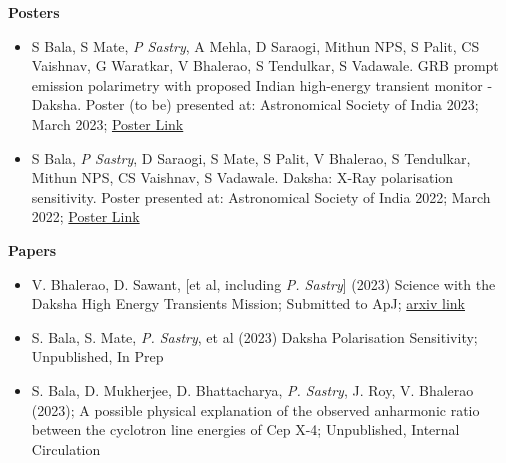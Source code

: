 {
    \textbf{Posters}
    \begin{itemize}
        \item S Bala, S Mate, \emph{P Sastry}, A Mehla, D Saraogi, Mithun NPS, S Palit, CS Vaishnav, G Waratkar, V Bhalerao, S Tendulkar, S Vadawale. GRB prompt emission polarimetry with proposed Indian high-energy transient monitor - Daksha. Poster (to be) presented at: Astronomical Society of India 2023; March 2023; \href{https://www.astron-soc.in/asi2023/abstract_details/ASI2023_664}{Poster Link}
        \item S Bala, \emph{P Sastry}, D Saraogi, S Mate, S Palit, V Bhalerao, S Tendulkar, Mithun NPS, CS Vaishnav, S Vadawale. Daksha: X-Ray polarisation sensitivity. Poster presented at: Astronomical Society of India 2022; March 2022; \href{https://astron-soc.in/asi2022/abstract_details/ASI2022_331}{Poster Link}
    \end{itemize}
}
{
    \begin{flushleft}
        \textbf{Papers}
    \end{flushleft}
    \begin{itemize}
        \item V. Bhalerao, D. Sawant, [et al, including \emph{P. Sastry}] (2023) Science with the Daksha High Energy Transients Mission; Submitted to ApJ; \href{https://arxiv.org/abs/2211.12052}{arxiv link}
        \item S. Bala, S. Mate, \emph{P. Sastry}, et al (2023) Daksha Polarisation Sensitivity; Unpublished, In Prep
        \item S. Bala, D. Mukherjee, D. Bhattacharya, \emph{P. Sastry}, J. Roy, V. Bhalerao (2023); A possible physical explanation of the observed anharmonic ratio between the cyclotron line energies of Cep X-4; Unpublished, Internal Circulation
    \end{itemize}
}
